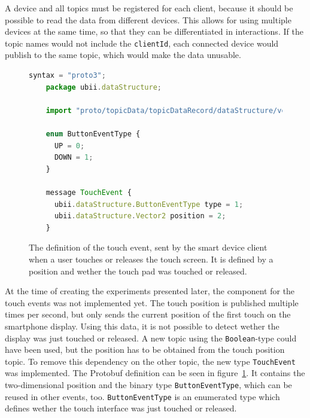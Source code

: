 A device and all topics must be registered for each client, because it should be possible to read the data from different devices. This allows for using multiple devices at the same time, so that they can be differentiated in interactions. If the topic names would not include the \lstinline{clientId}, each connected device would publish to the same topic, which would make the data unusable.

\begin{figure}[H]
  \begin{lstlisting}[language=JavaScript]
    syntax = "proto3";
    package ubii.dataStructure;
    
    import "proto/topicData/topicDataRecord/dataStructure/vector2.proto";
    
    enum ButtonEventType {
      UP = 0;
      DOWN = 1;
    }

    message TouchEvent {
      ubii.dataStructure.ButtonEventType type = 1;
      ubii.dataStructure.Vector2 position = 2;
    }
  \end{lstlisting}
  \caption[The definition of the touch event.]{The definition of the touch event, sent by the smart device client when a user touches or releases the touch screen. It is defined by a position and wether the touch pad was touched or released.}\label{fig:ubii-event-type}
\end{figure}

At the time of creating the experiments presented later, the component for the touch events was not implemented yet. The touch position is published multiple times per second, but only sends the current position of the first touch on the smartphone display. Using this data, it is not possible to detect wether the display was just touched or released. A new topic using the \lstinline{Boolean}-type could have been used, but the position has to be obtained from the touch position topic. To remove this dependency on the other topic, the new type \lstinline{TouchEvent} was implemented. The \ac{Protobuf} definition can be seen in figure~\ref{fig:ubii-event-type}. It contains the two-dimensional position and the binary type \lstinline{ButtonEventType}, which can be reused in other events, too. \lstinline{ButtonEventType} is an enumerated type which defines wether the touch interface was just touched or released.

